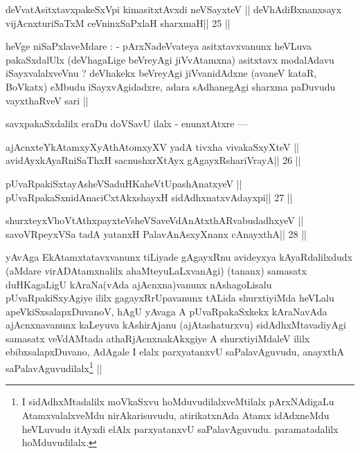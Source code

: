 \begin{shl}
deVvatAsitxtavxpakeSxV\s pi kimasitxtAvxdi neVSayxteV ||
deVhAdiBxnanxsayx vijAcnxturiSaTxM ceVninxSaPxlaH sharxmaH\hfill || 25 ||
\end{shl}

\begin{artha}
heVge niSaPxlaveMdare : - pArxNadeVvateya asitxtavxvanunx heVLuva pakaSxdalUlx (deVhagaLige beVreyAgi jiVvAtamxna) asitxtavx modalAdavu iSayxvalalxveVnu ? deVhakekx beVreyAgi jiVvanidAdxne (avaneV kataR, BoVkatx) eMbudu iSayxvAgidadxre, adara sAdhanegAgi sharxma paDuvudu vayxthaRveV sari ||
\end{artha}

\begin{artha}
savxpakaSxdalilx eraDu doVSavU ilalx - enunxtAtxre ---
\end{artha}

\begin{shl}
ajAcnxteYkAtamxyXyAthAtomxyXV yadA tivxha vivakaSxyXteV ||
avidAyxkAyaRniSaThxH sacnushxrXtAyx gAgayxRshariVrayA\hfill || 26 ||
\end{shl}

\begin{shl}
pUvaRpakiSxtayA\s sheVSaduHKaheVtUpashAnatxyeV ||
pUvaRpakaSxnidAnaciCxtAkxshayxH sidAdhxnatxvAdayxpi\hfill || 27 ||
\end{shl}

\begin{shl}
shurxteyxVhoVtAthxpayxteV\s sheVSaveVdAnAtxthARvabudadhxyeV ||
savoVR\s peyxVSa tadA yatanxH PalavAnAsxyXnanx cAnayxthA\hfill || 28 ||
\end{shl}

\begin{artha}
yAvAga EkAtamxtatavxvanunx tiLiyade gAgayxRnu avideyxya kAyaRdalilxdudx (aMdare virADAtamxnalilx ahaMteyuLaLxvanAgi) (tananx) samasatx duHKagaLigU kAraNa(vAda ajAcnxna)vanunx nAshagoLisalu pUvaRpakiSxyAgiye ililx gagayxRrUpavanunx tALida shurxtiyiMda heVLalu apeVkiSxsalapxDuvanoV, hAgU yAvaga A pUvaRpakaSxkekx kAraNavAda ajAcnxnavanunx kaLeyuva kAshirAjanu (ajAtashaturxvu) sidAdhxMtavadiyAgi samasatx veVdAMtada athaRjAcnxnakAkxgiye A shurxtiyiMdaleV ililx ebibxsalapxDuvano, AdAgale I elalx parxyatanxvU saPalavAguvudu, anayxthA saPalavAguvudilalx\footnote[2]{I sidAdhxMtadalilx moVkaSxvu hoMduvudilalxveMtilalx pArxNAdigaLu AtamxvalalxveMdu nirAkarisuvudu, atirikatxnAda Atamx idAdxneMdu heVLuvudu itAyxdi elAlx parxyatanxvU saPalavAguvudu. paramatadalilx hoMduvudilalx.} ||
\end{artha}

